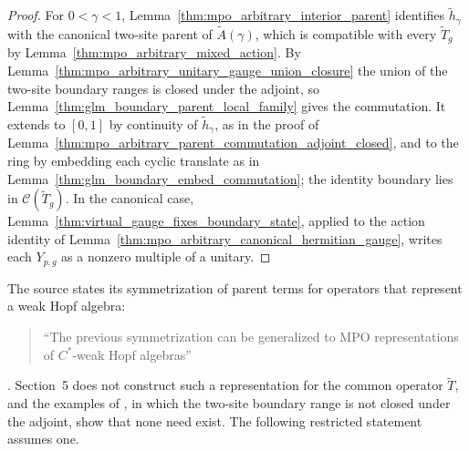 \begin{proof}
    \leanok
    For $0<\gamma<1$, Lemma~\ref{thm:mpo_arbitrary_interior_parent}
    identifies $\widetilde h_\gamma$ with the canonical two-site parent of
    $\widetilde A(\gamma)$, which is compatible with every $\widetilde T_g$
    by Lemma~\ref{thm:mpo_arbitrary_mixed_action}. By
    Lemma~\ref{thm:mpo_arbitrary_unitary_gauge_union_closure} the union of
    the two-site boundary ranges is closed under the adjoint, so
    Lemma~\ref{thm:glm_boundary_parent_local_family} gives the commutation.
    It extends to $[0,1]$ by continuity of $\widetilde h_\gamma$, as in
    the proof of
    Lemma~\ref{thm:mpo_arbitrary_parent_commutation_adjoint_closed}, and
    to the ring by embedding each cyclic translate as in
    Lemma~\ref{thm:glm_boundary_embed_commutation}; the identity boundary
    lies in $\mathcal C(\widetilde T_g)$. In the canonical case,
    Lemma~\ref{thm:virtual_gauge_fixes_boundary_state}, applied to the
    action identity of
    Lemma~\ref{thm:mpo_arbitrary_canonical_hermitian_gauge}, writes each
    $Y_{p,g}$ as a nonzero multiple of a unitary.
\end{proof}

The source states its symmetrization of parent terms for operators that
represent a weak Hopf algebra:
\begin{quote}
    ``The previous symmetrization can be generalized to MPO representations
    of ${C}^*$-weak Hopf algebras''
\end{quote}
\cite[Section~5 and Appendix~B]{GarreRubio2023MPOSym}. Section~5 does not
construct such a representation for the common operator $\widetilde T$,
and the examples of \cite{gap:glm23_mixed_path_parent_commutation}, in
which the two-site boundary range is not closed under the adjoint, show
that none need exist. The following restricted statement assumes
one.

